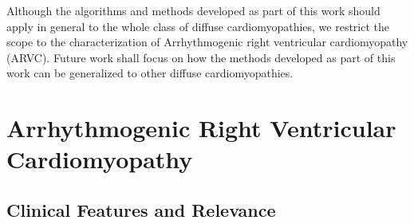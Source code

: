 Although the algorithms and methods developed as part of this work should apply in general to the whole class of diffuse cardiomyopathies, we restrict the scope to the characterization of Arrhythmogenic right ventricular cardiomyopathy (ARVC). Future work shall focus on how the methods developed as part of this work can be generalized to other diffuse cardiomyopathies.

%

\section{Arrhythmogenic Right Ventricular Cardiomyopathy}

\subsection{Clinical Features and Relevance}

